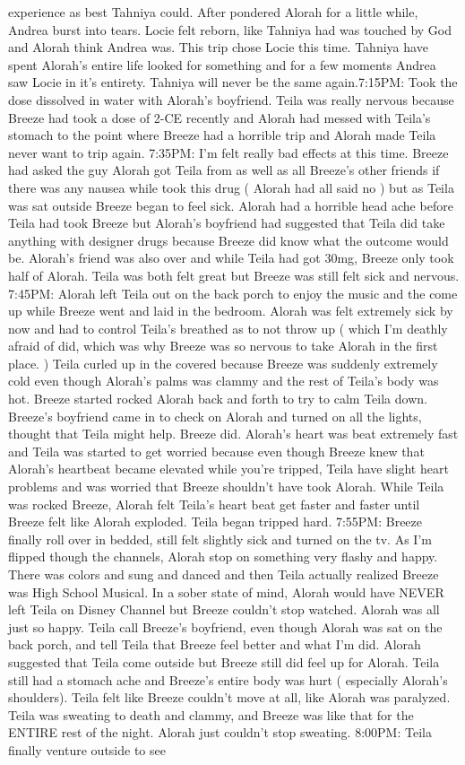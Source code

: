 \documentclass[12pt]{book}
\begin{document}
experience as best Tahniya could. After pondered Alorah for a little while, Andrea burst into tears. Locie felt reborn, like Tahniya had was touched by God and Alorah think Andrea was. This trip chose Locie this time. Tahniya have spent Alorah's entire life looked for something and for a few moments Andrea saw Locie in it's entirety. Tahniya will never be the same again.7:15PM: Took the dose dissolved in water with Alorah's boyfriend. Teila was really nervous because Breeze had took a dose of 2-CE recently and Alorah had messed with Teila's stomach to the point where Breeze had a horrible trip and Alorah made Teila never want to trip again. 7:35PM: I'm felt really bad effects at this time. Breeze had asked the guy Alorah got Teila from as well as all Breeze's other friends if there was any nausea while took this drug ( Alorah had all said no ) but as Teila was sat outside Breeze began to feel sick. Alorah had a horrible head ache before Teila had took Breeze but Alorah's boyfriend had suggested that Teila did take anything with designer drugs because Breeze did know what the outcome would be. Alorah's friend was also over and while Teila had got 30mg, Breeze only took half of Alorah. Teila was both felt great but Breeze was still felt sick and nervous. 7:45PM: Alorah left Teila out on the back porch to enjoy the music and the come up while Breeze went and laid in the bedroom. Alorah was felt extremely sick by now and had to control Teila's breathed as to not throw up ( which I'm deathly afraid of did, which was why Breeze was so nervous to take Alorah in the first place. ) Teila curled up in the covered because Breeze was suddenly extremely cold even though Alorah's palms was clammy and the rest of Teila's body was hot. Breeze started rocked Alorah back and forth to try to calm Teila down. Breeze's boyfriend came in to check on Alorah and turned on all the lights, thought that Teila might help. Breeze did. Alorah's heart was beat extremely fast and Teila was started to get worried because even though Breeze knew that Alorah's heartbeat became elevated while you're tripped, Teila have slight heart problems and was worried that Breeze shouldn't have took Alorah. While Teila was rocked Breeze, Alorah felt Teila's heart beat get faster and faster until Breeze felt like Alorah exploded. Teila began tripped hard. 7:55PM: Breeze finally roll over in bedded, still felt slightly sick and turned on the tv. As I'm flipped though the channels, Alorah stop on something very flashy and happy. There was colors and sung and danced and then Teila actually realized Breeze was High School Musical. In a sober state of mind, Alorah would have NEVER left Teila on Disney Channel but Breeze couldn't stop watched. Alorah was all just so happy. Teila call Breeze's boyfriend, even though Alorah was sat on the back porch, and tell Teila that Breeze feel better and what I'm did. Alorah suggested that Teila come outside but Breeze still did feel up for Alorah. Teila still had a stomach ache and Breeze's entire body was hurt ( especially Alorah's shoulders). Teila felt like Breeze couldn't move at all, like Alorah was paralyzed. Teila was sweating to death and clammy, and Breeze was like that for the ENTIRE rest of the night. Alorah just couldn't stop sweating. 8:00PM: Teila finally venture outside to see 
\end{document}
